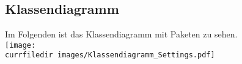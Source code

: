 \begin{samepage}
    \subsection{Klassendiagramm}\label{App_Settings_Klassendiagramm}
    Im Folgenden ist das Klassendiagramm mit Paketen zu sehen.\\
    \texttt{[image: \\currfiledir images/Klassendiagramm\_Settings.pdf]}

\end{samepage}